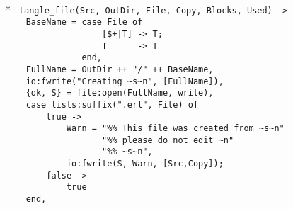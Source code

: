 \begin{flushleft}
\label{etangle_3_4}
\\*
\tt
\noindent{}%
\verb&tangle_file(Src, OutDir, File, Copy, Blocks, Used) ->&\\
\noindent{}%
\verb&    BaseName = case File of &\\
\noindent{}%
\verb&                   [$+|T] -> T;&\\
\noindent{}%
\verb&                   T      -> T&\\
\noindent{}%
\verb&               end,&\\
\noindent{}%
\verb&    FullName = OutDir ++ "/" ++ BaseName,&\\
\noindent{}%
\verb&    io:fwrite("Creating ~s~n", [FullName]),&\\
\noindent{}%
\verb&    {ok, S} = file:open(FullName, write),&\\
\noindent{}%
\verb&    case lists:suffix(".erl", File) of&\\
\noindent{}%
\verb&        true ->&\\
\noindent{}%
\verb&            Warn = "%% This file was created from ~s~n"&\\
\noindent{}%
\verb&                   "%% please do not edit ~n"&\\
\noindent{}%
\verb&                   "%% ~s~n",&\\
\noindent{}%
\verb&            io:fwrite(S, Warn, [Src,Copy]);&\\
\noindent{}%
\verb&        false ->&\\
\noindent{}%
\verb&            true&\\
\noindent{}%
\verb&    end,&\\
\noindent{}%

\end{flushleft}
